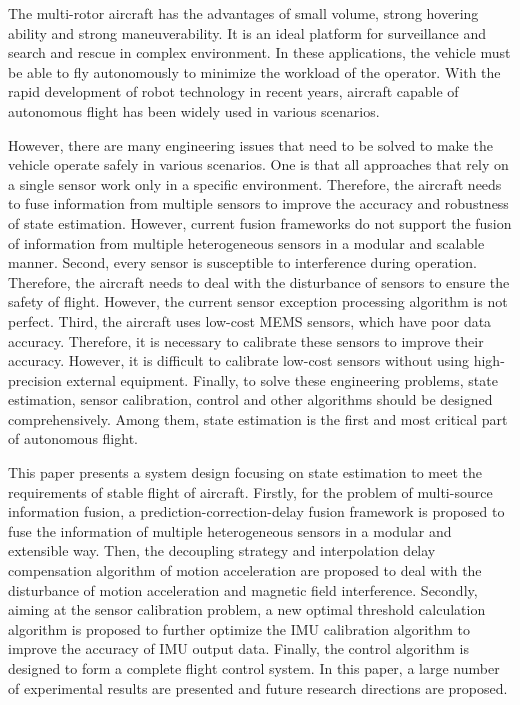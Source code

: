 \documentclass[
  type=master
]{gdutthesis}
\begin{document}
\begin{abstract*}
  The multi-rotor aircraft has the advantages of small volume, strong hovering ability and strong maneuverability. It is an ideal platform for surveillance and search and rescue in complex environment.  
  In these applications, the vehicle must be able to fly autonomously to minimize the workload of the operator.  
  With the rapid development of robot technology in recent years, aircraft capable of autonomous flight has been widely used in various scenarios.  
  
  However, there are many engineering issues that need to be solved to make the vehicle operate safely in various scenarios.  
  One is that all approaches that rely on a single sensor work only in a specific environment.  
  Therefore, the aircraft needs to fuse information from multiple sensors to improve the accuracy and robustness of state estimation.  
  However, current fusion frameworks do not support the fusion of information from multiple heterogeneous sensors in a modular and scalable manner.  
  Second, every sensor is susceptible to interference during operation.  
  Therefore, the aircraft needs to deal with the disturbance of sensors to ensure the safety of flight.  
  However, the current sensor exception processing algorithm is not perfect.  
  Third, the aircraft uses low-cost MEMS sensors, which have poor data accuracy.  
  Therefore, it is necessary to calibrate these sensors to improve their accuracy.  
  However, it is difficult to calibrate low-cost sensors without using high-precision external equipment.  
  Finally, to solve these engineering problems, state estimation, sensor calibration, control and other algorithms should be designed comprehensively.  
  Among them, state estimation is the first and most critical part of autonomous flight.  
  
  This paper presents a system design focusing on state estimation to meet the requirements of stable flight of aircraft.  
  Firstly, for the problem of multi-source information fusion, a prediction-correction-delay fusion framework is proposed to fuse the information of multiple heterogeneous sensors in a modular and extensible way.  
  Then, the decoupling strategy and interpolation delay compensation algorithm of motion acceleration are proposed to deal with the disturbance of motion acceleration and magnetic field interference.  
  Secondly, aiming at the sensor calibration problem, a new optimal threshold calculation algorithm is proposed to further optimize the IMU calibration algorithm to improve the accuracy of IMU output data.  
  Finally, the control algorithm is designed to form a complete flight control system.  
  In this paper, a large number of experimental results are presented and future research directions are proposed.  
\end{abstract*}
\end{document}
